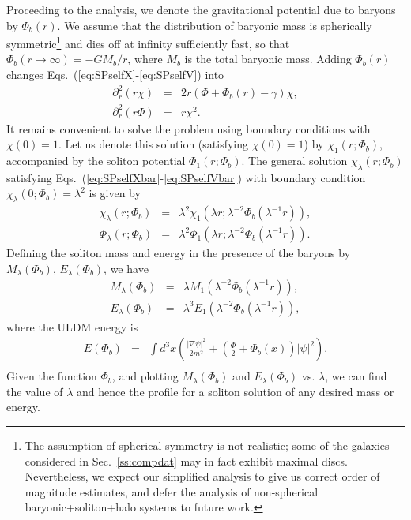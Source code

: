 \documentclass[aps,prd,floats,superscriptaddress,showpacs,nofootinbib,twocolumn,preprintnumbers]{revtex4-1}%
\def\be{\begin{eqnarray}}
\def\ee{\end{eqnarray}}
\def\no{\nonumber}
\begin{document}
Proceeding to the analysis, we denote the gravitational potential due
to baryons by $\Phi_b(r)$. We assume that the distribution of
baryonic mass is spherically symmetric\footnote{The assumption of
  spherical symmetry is not realistic; some of the galaxies
  considered in Sec.~\ref{ss:compdat} may in fact exhibit maximal
  discs. Nevertheless, we expect our simplified analysis to give us
  correct order of magnitude estimates, and defer the analysis of
  non-spherical baryonic+soliton+halo systems to future work.} and
dies off at infinity sufficiently fast, so that
$\Phi_b(r\to\infty)=-GM_b/r$, where $M_b$ is the total baryonic mass. 
Adding $\Phi_b(r)$ changes Eqs.~(\ref{eq:SPselfX}-\ref{eq:SPselfV}) into~\cite{Arbey:2001qi}
%
\be\partial_r^2\left(r\chi\right)&=&2r\left(\Phi+\Phi_b\left(r\right)-\gamma\right)\chi,\label{eq:SPselfXbar}\\
\partial_r^2\left(r\Phi\right)&=&r\chi^2\label{eq:SPselfVbar}.\ee
%
It remains convenient to solve the problem using boundary conditions
with $\chi(0)=1$.  
Let us denote this solution (satisfying $\chi(0)=1$) by
$\chi_1(r;\Phi_b)$, accompanied by the soliton potential
$\Phi_1(r;\Phi_b)$. The general solution $\chi_\lambda(r;\Phi_b)$
satisfying Eqs.~(\ref{eq:SPselfXbar}-\ref{eq:SPselfVbar}) with
boundary condition $\chi_\lambda(0;\Phi_b)=\lambda^2$ is given by  
%
\be
\chi_\lambda(r;\Phi_b)&=&\lambda^2\chi_1\left(\lambda r;\lambda^{-2}\Phi_b\left(\lambda^{-1}r\right)\right), \label{eq:solbar1}\\
\Phi_\lambda(r;\Phi_b)&=&\lambda^2\Phi_1\left(\lambda r;\lambda^{-2}\Phi_b\left(\lambda^{-1}r\right)\right).\label{eq:solbar2}\ee
%
Defining the soliton mass and energy in the presence of the baryons by $M_\lambda(\Phi_b),\,E_\lambda(\Phi_b)$, we have
%
\be\label{eq:MlamBar} M_\lambda(\Phi_b)&=&\lambda M_1\left(\lambda^{-2}\Phi_b\left(\lambda^{-1} r\right)\right),\\
E_\lambda(\Phi_b)&=&\lambda^3E_1\left(\lambda^{-2}\Phi_b\left(\lambda^{-1} r\right)\right),\ee
%
where the ULDM energy is 
%
\be \label{eq:Egenbar}E(\Phi_b)&=&\int
d^3x\left(\frac{\left|\nabla\psi\right|^2}{2m^2}
+\left(\frac{\Phi}{2}+\Phi_b(x)\right)\left|\psi\right|^2\right).\no\\&&\ee
%
Given the function $\Phi_b$, and plotting $M_\lambda(\Phi_b)$ and
$E_\lambda(\Phi_b)$ vs. $\lambda$, we can find the value of $\lambda$
and hence the profile for a soliton solution of any desired mass or
energy. 
\end{document}
